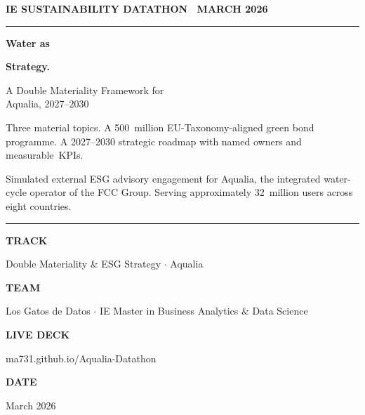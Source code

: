 \documentclass[11pt, a4paper, twoside, openright]{scrreprt}
\newcommand{\euro}{\texteuro}
\begin{document}
\begin{titlepage}
\thispagestyle{empty}

\vspace*{1.6cm}

{\sffamily\color{aqua}\bfseries\large IE SUSTAINABILITY DATATHON \textbullet\ MARCH 2026}
\par\vspace{0.3cm}
\textcolor{aqua}{\rule{\textwidth}{1.2pt}}
\par\vspace{2.6cm}

{\fontsize{56pt}{60pt}\selectfont\sffamily\bfseries\color{navy} Water as}\par
\vspace{0.2cm}
{\fontsize{56pt}{60pt}\selectfont\sffamily\bfseries\color{aqua} Strategy.}\par

\vspace{1.2cm}
{\Large\sffamily\color{deep} A Double Materiality Framework for\\ Aqualia, 2027--2030}\par

\vspace{2.0cm}
{\large\color{ink} Three material topics. A \euro{}500~million EU-Taxonomy-aligned green bond programme. A 2027--2030 strategic roadmap with named owners and measurable~KPIs.}\par

\vspace{0.6cm}
{\normalsize\color{slate} Simulated external ESG advisory engagement for Aqualia, the integrated water-cycle operator of the FCC Group. Serving approximately 32~million users across eight countries.}\par

\vfill

\textcolor{navy}{\rule{\textwidth}{0.8pt}}
\par\vspace{0.5cm}

\noindent
\newcommand{\tplabel}[1]{\parbox[t]{3.2cm}{\small\sffamily\bfseries\color{aqua}#1}}
\newcommand{\tpvalue}[1]{\parbox[t]{12cm}{\color{navy}#1}}

\tplabel{TRACK}\tpvalue{Double Materiality \& ESG Strategy $\cdot$ Aqualia}\par\smallskip
\tplabel{TEAM}\tpvalue{Los Gatos de Datos $\cdot$ IE Master in Business Analytics \& Data Science}\par\smallskip
\tplabel{LIVE DECK}\tpvalue{\ttfamily ma731.github.io/Aqualia-Datathon}\par\smallskip
\tplabel{DATE}\tpvalue{March 2026}\par

\end{titlepage}
\end{document}
